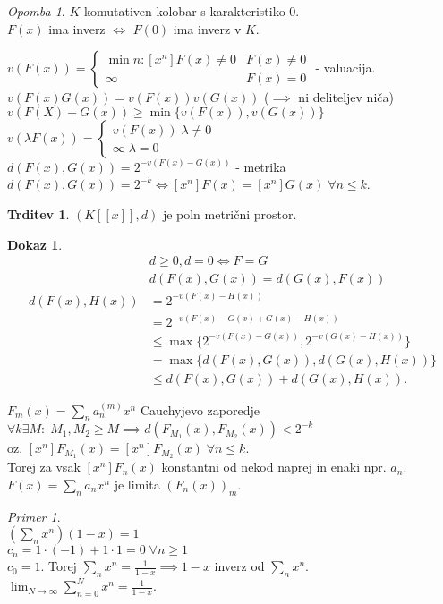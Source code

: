 \documentclass[a4paper, 12pt]{book}
\theoremstyle{definition}
\newtheorem{claim}[counter]{Trditev}
\newtheorem{pro}[counter]{Dokaz}
\theoremstyle{remark}
\newtheorem*{ex}{Primer}
\newtheorem*{rem}{Opomba}
\begin{document}
\begin{rem}
  $K$ komutativen kolobar s karakteristiko $0$. \\
  $F(x)$ ima inverz $\iff$ $F(0)$ ima inverz v $K$.
\end{rem}
$v(F(x)) = \begin{cases}
  \min n: [x^n]F(x) \neq 0 &F(x) \neq 0 \\
  \infty &F(x) = 0
\end{cases}$ - valuacija. \\
$v(F(x) G(x)) = v(F(x)) v(G(x))$ ($\implies$ ni deliteljev niča) \\
$v(F(X) + G(x)) \geq \min \{v(F(x)), v(G(x))\}$ \\
$v(\lambda F(x)) = \begin{cases}
  v(F(x)) \; \lambda \neq 0 \\
  \infty \; \lambda = 0
\end{cases}$ \\
$d(F(x), G(x)) = 2^{-v(F(x) - G(x))}$ - metrika \\
$d(F(x), G(x)) = 2^{-k} \iff [x^n] F(x) = [x^n] G(x) \; \forall n \leq k$.
\begin{claim}
  $(K[[x]], d)$ je poln metrični prostor.
\end{claim}
\begin{pro}
  \begin{align*}
    &d \geq 0, d = 0 \iff F = G \\
    &d(F(x), G(x)) = d(G(x), F(x)) \\
    d(F(x), H(x)) &= 2^{-v(F(x) - H(x))} \\
    &= 2^{-v(F(x) - G(x) + G(x) - H(x))} \\
    &\leq \max \{2^{-v(F(x) - G(x))}, 2^{-v(G(x) - H(x))}\} \\
    &= \max \{d(F(x), G(x)), d(G(x), H(x))\} \\
    &\leq d(F(x), G(x)) + d(G(x), H(x)).
  \end{align*}
\end{pro}
$F_m(x) = \sum_n a_n^{(m)} x^n$ Cauchyjevo zaporedje \\
$\forall k \exists M: \; M_1, M_2 \geq M \implies d(F_{M_1}(x), F_{M_2}(x)) < 2^{-k}$ \\
oz. $[x^n] F_{M_1} (x) = [x^n] F_{M_2} (x) \; \forall n \leq k$. \\
Torej za vsak $[x^n] F_n(x)$ konstantni od nekod naprej in enaki npr. $a_n$. \\
$F(x) = \sum_n a_n x^n$ je limita $(F_n(x))_m$.
\begin{ex} \text{} \\
  $(\sum_n x^n) (1-x) = 1$ \\
  $c_n = 1 \cdot (-1) + 1 \cdot 1 = 0 \; \forall n \geq 1$ \\
  $c_0 = 1$.
  Torej $\sum_n x^n = \frac{1}{1-x} \implies 1-x$ inverz od $\sum_n x^n$. \\
  $\lim_{N \to \infty} \sum_{n=0}^{N} x^n = \frac{1}{1-x}$. \\
\end{ex}
\end{document}
